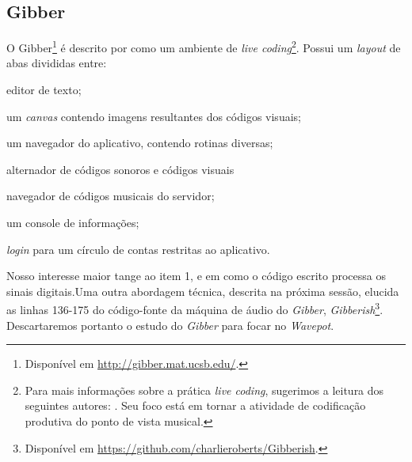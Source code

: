 \subsection*{Gibber}

O Gibber\footnote{Disponível em \url{http://gibber.mat.ucsb.edu/}.} é descrito por \cite{roberts_gibber:_2012} como um ambiente de \emph{live coding}\footnote{Para mais informações sobre a prática \emph{live coding}, sugerimos a leitura dos seguintes autores: \cite{collins_live_2003,ward_live_2004,collins_live_2007,rohrhuber_improvising_2009,magnusson_algorithms_2011,collins_origins_2014}. Seu foco está em tornar a atividade de codificação produtiva do ponto de vista musical.}. Possui um \emph{layout} de abas divididas entre: \begin{inparaenum}
\item editor de texto;
\item um \emph{canvas} contendo imagens resultantes dos códigos visuais;
\item um navegador do aplicativo, contendo rotinas diversas;
\item alternador de códigos sonoros e códigos visuais
\item navegador de códigos musicais do servidor;
\item um console de informações;
\item \emph{login} para um círculo de contas restritas ao aplicativo.
\end{inparaenum}Nosso interesse maior tange ao item 1, e em como o código escrito processa os sinais digitais.Uma outra abordagem técnica, descrita na próxima sessão,  elucida as linhas 136-175 do código-fonte da máquina de áudio do \emph{Gibber}, \emph{Gibberish}\footnote{Disponível em \url{https://github.com/charlieroberts/Gibberish}.}. Descartaremos portanto o estudo do \emph{Gibber} para focar no \emph{Wavepot}.


